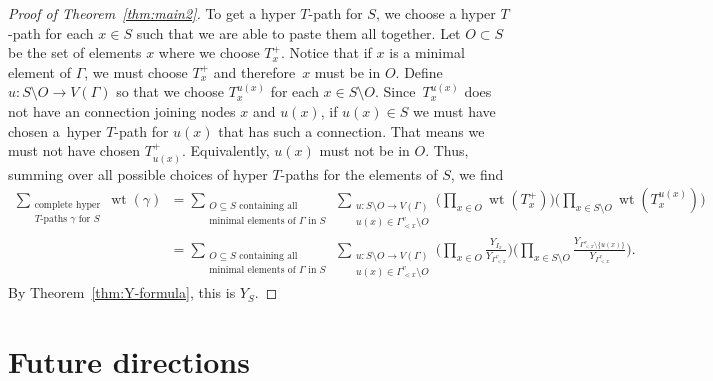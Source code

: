 \documentclass[pdftex]{sigma}
\numberwithin{equation}{section}
\DeclareMathOperator{\wt}{wt}
\begin{document}
\begin{proof}[Proof of Theorem~\ref{thm:main2}]
To get a hyper $T$-path for $S$, we choose a hyper $T$-path for each $x\in S$ such that we are able to paste them all together. Let $O\subset S$ be the set of elements $x$ where we choose $T_x^{+}$. Notice that if $x$ is a minimal element of $\Gamma$, we must choose $T_x^{+}$ and therefore~$x$ must be in $O$. Define $u\colon S\setminus O\to V(\Gamma)$ so that we choose $T_x^{u(x)}$ for each $x\in S\setminus O$. Since~$T_x^{u(x)}$ does not have an connection joining nodes $x$ and $u(x)$, if $u(x)\in S$ we must have chosen a~hyper $T$-path for $u(x)$ that has such a connection. That means we must not have chosen $T_{u(x)}^+$. Equivalently, $u(x)$ must not be in $O$.
Thus, summing over all possible choices of hyper $T$-paths for the elements of $S$, we find
\begin{align*}
\sum_{\substack{\text{complete hyper}\\T\text{-paths }\gamma\text{ for }S}}\wt(\gamma)&=\sum_{\substack{O\subseteq S\text{ containing all}\\ \text{minimal elements of }\Gamma\text{ in }S}} \, \sum_{\substack{u\colon S\setminus O\to V(\Gamma)\\ u(x)\in\Gamma_{\lessdot x}^v\setminus O}}\bigg(\prod_{x\in O}\wt(T_x^{+})\bigg)\bigg(\prod_{x\in S\setminus O}\wt(T_x^{u(x)})\bigg)\\
&=\sum_{\substack{O\subseteq S\text{ containing all}\\ \text{minimal elements of }\Gamma\text{ in }S}} \, \sum_{\substack{u\colon S\setminus O\to V(\Gamma)\\ u(x)\in\Gamma_{\lessdot x}^v\setminus O}}\bigg(\prod_{x\in O}\frac{Y_{I_{x}}}{Y_{\Gamma_{< x}^v}}\bigg)\bigg(\prod_{x\in S\setminus O}\frac{Y_{\Gamma_{< x}^v\setminus\{u(x)\}} }{Y_{\Gamma_{< x}^v}}\bigg).
\end{align*}
By Theorem~\ref{thm:Y-formula}, this is $Y_S$.
\end{proof}
\section{Future directions}\label{sec:future}
\end{document}
